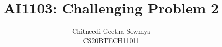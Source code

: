 \documentclass[journal,12pt,twocolumn]{IEEEtran}
\DeclareMathOperator*{\Res}{Res}
\begin{document}
\newtheorem{theorem}{Theorem}[section]
\newtheorem{problem}{Problem}
\newtheorem{proposition}{Proposition}[section]
\newtheorem{lemma}{Lemma}[section]
\newtheorem{corollary}[theorem]{Corollary}
\newtheorem{example}{Example}[section]
\newtheorem{definition}[problem]{Definition}

\newcommand{\BEQA}{\begin{eqnarray}}
\newcommand{\EEQA}{\end{eqnarray}}
\newcommand{\define}{\stackrel{\triangle}{=}}

\raggedbottom
\setlength{\parindent}{0pt}
\providecommand{\mbf}{\mathbf}
\providecommand{\pr}[1]{\ensuremath{\pr\left(#1\right)}}
\providecommand{\qfunc}[1]{\ensuremath{Q\left(#1\right)}}
\providecommand{\sbrak}[1]{\ensuremath{{}\left[#1\right]}}
\providecommand{\lsbrak}[1]{\ensuremath{{}\left[#1\right.}}
\providecommand{\rsbrak}[1]{\ensuremath{{}\left.#1\right]}}
\providecommand{\brak}[1]{\ensuremath{\left(#1\right)}}
\providecommand{\lbrak}[1]{\ensuremath{\left(#1\right.}}
\providecommand{\cbrak}[1]{\ensuremath{\left\{#1\right\}}}
\providecommand{\lcbrak}[1]{\ensuremath{\left\{#1\right.}}
\providecommand{\rcbrak}[1]{\ensuremath{\left.#1\right\}}}
\theoremstyle{remark}
\newtheorem{rem}{Remark}
\newcommand{\sgn}{\mathop{\mathrm{sgn}}}


\providecommand{\system}{\overset{\mathcal{H}}{ \longleftrightarrow}}

\newcommand{\solution}{\noindent \textbf{Solution: }}
\newcommand{\cosec}{\,\text{cosec}\,}
\providecommand{\dec}[2]{\ensuremath{\overset{#1}{\underset{#2}{\gtrless}}}}
\newcommand{\myvec}[1]{\ensuremath{\begin{pmatrix}#1\end{pmatrix}}}
\newcommand{\mydet}[1]{\ensuremath{\begin{vmatrix}#1\end{vmatrix}}}
\makeatletter
{}
\makeatother
\let\StandardTheFigure\thefigure
\let\vec\mathbf
\renewcommand{\thefigure}{\theproblem}
\def\putbox#1#2#3{\makebox[0in][l]{\makebox[#1][l]{}\raisebox{\baselineskip}[0in][0in]{\raisebox{#2}[0in][0in]{#3}}}}
     \def\rightbox#1{\makebox[0in][r]{#1}}
     \def\centbox#1{\makebox[0in]{#1}}
     \def\topbox#1{\raisebox{-\baselineskip}[0in][0in]{#1}}
     \def\midbox#1{\raisebox{-0.5\baselineskip}[0in][0in]{#1}}
\vspace{3cm}
\title{AI1103: Challenging Problem 2}
\author{Chitneedi Geetha Sowmya \\ CS20BTECH11011}
\maketitle
\newpage
\bigskip
\renewcommand{\thefigure}{\theenumi}
\renewcommand{\thetable}{\theenumi}
\end{document}
